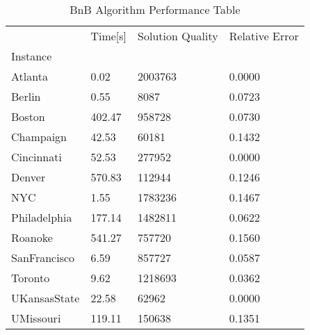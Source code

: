 \begin{table}[htpb]
\caption{ BnB Algorithm Performance Table }
\begin{tabular}{llll}
\toprule
{} & Time[s] & Solution Quality & Relative Error \\
Instance     &         &                  &                \\
\midrule
Atlanta      &    0.02 &          2003763 &         0.0000 \\
Berlin       &    0.55 &             8087 &         0.0723 \\
Boston       &  402.47 &           958728 &         0.0730 \\
Champaign    &   42.53 &            60181 &         0.1432 \\
Cincinnati   &   52.53 &           277952 &         0.0000 \\
Denver       &  570.83 &           112944 &         0.1246 \\
NYC          &    1.55 &          1783236 &         0.1467 \\
Philadelphia &  177.14 &          1482811 &         0.0622 \\
Roanoke      &  541.27 &           757720 &         0.1560 \\
SanFrancisco &    6.59 &           857727 &         0.0587 \\
Toronto      &    9.62 &          1218693 &         0.0362 \\
UKansasState &   22.58 &            62962 &         0.0000 \\
UMissouri    &  119.11 &           150638 &         0.1351 \\
\bottomrule
\end{tabular}
\end{table}
